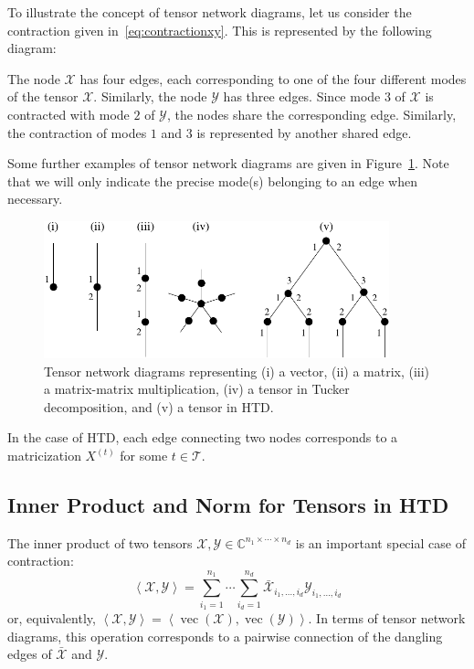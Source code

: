 \documentclass[11pt, a4paper]{article}
\newcommand{\calT}{\mathcal{T}}
\newcommand{\calX}{\mathcal{X}}
\newcommand{\calY}{\mathcal{Y}}
\newcommand{\C}{{\mathbb C}}
\DeclareMathOperator{\vect}{vec}
\newcommand{\innerprod}[2]{{\left\langle#1,#2\right\rangle}}
\begin{document}
To illustrate the concept of tensor network diagrams, let us consider the contraction given
in~\eqref{eq:contractionxy}. This is represented by the following diagram:
\begin{center}
\resizebox{!}{2cm}{}
\end{center}
The node $\calX$ has four edges, each corresponding to one of the four different modes 
of the tensor $\calX$. Similarly, the node $\calY$ has three edges. Since mode $3$
of $\calX$ is contracted with mode $2$ of $\calY$, the nodes share the corresponding edge.
Similarly, the contraction of modes $1$ and $3$ is represented by another shared edge.

Some further examples of tensor network diagrams are given in 
Figure~\ref{fig:tnexamples}. Note that we will only indicate
the precise mode(s) belonging
to an edge when necessary.
\begin{figure}
\begin{center}
  \includegraphics[width=10cm]{tensor_network}
\end{center}
 \caption{Tensor network diagrams representing
(i) a vector, (ii) a matrix, (iii) a matrix-matrix multiplication, (iv) a tensor in Tucker decomposition,
and (v) a tensor in HTD. } \label{fig:tnexamples}
\end{figure}
In the case of HTD, each edge connecting two nodes
corresponds to a matricization $X^{(t)}$ for some $t \in \calT$.

\subsection{Inner Product and Norm for Tensors in HTD} \label{sec:innerprod}

The inner product of two tensors $\calX, \calY \in \C^{n_1 \times \cdots \times n_d}$
is an important special case of
contraction:
\[
\innerprod{\calX}{\calY} = \sum_{i_1=1}^{n_1} \cdots
\sum_{i_d=1}^{n_d} \bar{\calX}_{i_1,\ldots,i_d}
\calY_{i_1,\ldots,i_d}
\] 
or, equivalently, $\innerprod{\calX}{\calY} =
\innerprod{\vect(\calX)}{\vect(\calY)}$. In terms of tensor network diagrams, this operation
corresponds to a pairwise connection of the dangling edges of $\bar{\calX}$ and
$\calY$.
\end{document}
